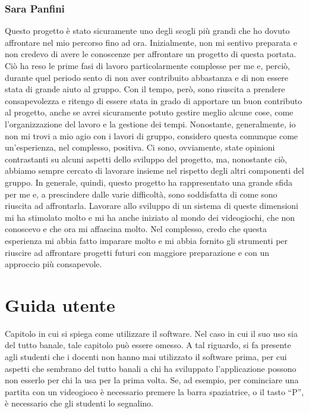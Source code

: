\documentclass[a4paper,12pt]{report}
\begin{document}
\subsection{Sara Panfini}
Questo progetto è stato sicuramente uno degli scogli più grandi che ho dovuto affrontare nel 
mio percorso fino ad ora. Inizialmente, non mi sentivo preparata e non credevo di avere le conoscenze
per affrontare un progetto di questa portata. Ciò ha reso le prime fasi di lavoro particolarmente complesse
per me e, perciò, durante quel periodo sento di non aver contribuito abbastanza e di non 
essere stata di grande aiuto al gruppo. Con il tempo, però, sono riuscita a prendere consapevolezza e ritengo
di essere stata in grado di apportare un buon contributo al progetto, anche se avrei sicuramente potuto gestire 
meglio alcune cose, come l'organizzazione del lavoro e la gestione dei tempi.\newline
Nonostante, generalmente, io non mi trovi a mio agio con i lavori di gruppo, considero questa comunque come
un'esperienza, nel complesso, positiva. Ci sono, ovviamente, state opinioni contrastanti su alcuni aspetti
dello sviluppo del progetto, ma, nonostante ciò, abbiamo sempre cercato di lavorare insieme nel rispetto degli 
altri componenti del gruppo.\newline
In generale, quindi, questo progetto ha rappresentato una grande sfida per me e, a prescindere dalle varie
difficoltà, sono soddisfatta di come sono riuscita ad affrontarla. Lavorare allo sviluppo di un sistema di queste
dimensioni mi ha stimolato molto e mi ha anche iniziato al mondo dei videogiochi, che non conoscevo e che ora mi affascina molto.
Nel complesso, credo che questa esperienza mi abbia fatto imparare molto e mi abbia fornito gli strumenti 
per riuscire ad affrontare progetti futuri con maggiore preparazione e con un approccio più consapevole.\newline

\appendix
\chapter{Guida utente}

Capitolo in cui si spiega come utilizzare il software. Nel caso in cui il suo uso sia del tutto
banale, tale capitolo può essere omesso.
%
A tal riguardo, si fa presente agli studenti che i docenti non hanno mai utilizzato il software
prima, per cui aspetti che sembrano del tutto banali a chi ha sviluppato l'applicazione possono non
esserlo per chi la usa per la prima volta.
%
Se, ad esempio, per cominciare una partita con un videogioco è necessario premere la barra
spaziatrice, o il tasto ``P'', è necessario che gli studenti lo segnalino.
\end{document}
